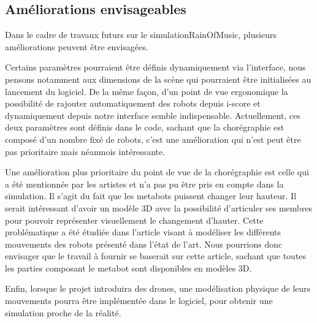 \subsection{Améliorations envisageables}

Dans le cadre de travaux futurs sur le simulationRainOfMusic, plusieurs améliorations peuvent être envisagées.

Certains paramètres pourraient être définis dynamiquement via l'interface, nous pensons notamment aux dimensions de la scène qui pourraient être initialisées au lancement du logiciel. De la même façon, d'un point de vue ergonomique la possibilité de rajouter automatiquement des robots depuis i-score et dynamiquement depuis notre interface semble indispensable. Actuellement, ces deux paramètres sont définis dans le code, sachant que la chorégraphie est composé d'un nombre fixé de robots, c'est une amélioration qui n'est peut être pas prioritaire mais néanmois intéressante.

Une amélioration plus prioritaire du point de vue de la chorégraphie est celle qui a été mentionnée par les artistes et n'a pas pu être pris en compte dans la simulation. Il s'agit du fait que les metabots puissent changer leur hauteur. Il serait intéressant d'avoir un modèle 3D avec la possibilité d'articuler ses membres pour pouvoir représenter visuellement le changement d'hauter. Cette problématique a été étudiée dans l'article visant à modéliser les différents mouvements des robots \cite{robotArt} présenté dans l'état de l'art. Nous pourrions donc envisager que le travail à fournir se baserait sur cette article, sachant que toutes les parties composant le metabot sont disponibles en modèles 3D.

Enfin, lorsque le projet introduira des drones, une modélisation physique de leurs mouvements pourra être implémentée dans le logiciel, pour obtenir une simulation proche de la réalité.

